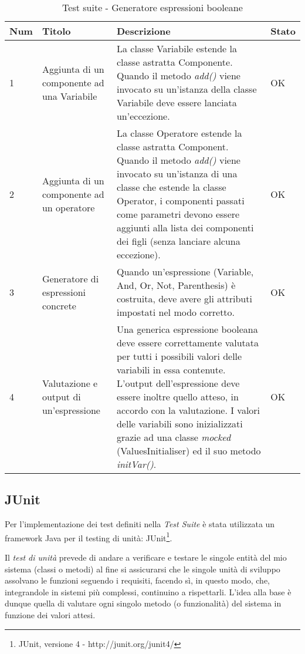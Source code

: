 \begin{table}[h!]
\caption{Test suite - Generatore espressioni booleane}
\centering %
\begin{tabular}{|p{1cm}|p{3cm}|p{7cm}|p{1cm}|} %
\hline\hline %
\textbf{Num} & \textbf{Titolo} & \textbf{Descrizione} & \textbf{Stato} \\ [0.5ex] %
\hline %
1 & Aggiunta di un componente ad una Variabile & La classe Variabile estende la classe astratta Componente. Quando il metodo \emph{add()} viene invocato su un'istanza della classe Variabile deve essere lanciata un'eccezione. & OK \\ \hline%
2 & Aggiunta di un componente ad un operatore & La classe Operatore estende la classe astratta Component. Quando il metodo \emph{add()} viene invocato su un'istanza di una classe che estende la classe Operator, i componenti passati come parametri devono essere aggiunti alla lista dei componenti dei figli (senza lanciare alcuna eccezione). & OK \\ \hline
3 & Generatore di espressioni concrete & Quando un'espressione (Variable, And, Or, Not, Parenthesis) è costruita, deve avere gli attributi impostati nel modo corretto. & OK \\ \hline
4 & Valutazione e output di un'espressione & Una generica espressione booleana deve essere correttamente valutata per tutti i possibili valori delle variabili in essa contenute. L'output dell'espressione deve essere inoltre quello atteso, in accordo con la valutazione. I valori delle variabili sono inizializzati grazie ad una classe \emph{mocked} (ValuesInitialiser) ed il suo metodo \emph{initVar()}. & OK \\ [1ex] %
\hline %
\end{tabular}
\label{table:observerstrategy} 
\end{table}


\subsection{JUnit}

Per l'implementazione dei test definiti nella \emph{Test Suite} è stata utilizzata un framework Java per il testing di unità: JUnit\footnote{JUnit, versione 4 - http://junit.org/junit4/}.

Il \emph{test di unità} prevede di andare a verificare e testare le singole entità del mio sistema (classi o metodi) al fine si assicurarsi che le singole unità di sviluppo assolvano le funzioni seguendo i requisiti, facendo sì, in questo modo, che, integrandole in sistemi più complessi, continuino a rispettarli. 
L'idea alla base è dunque quella di valutare ogni singolo metodo (o funzionalità) del sistema in funzione dei valori attesi.


